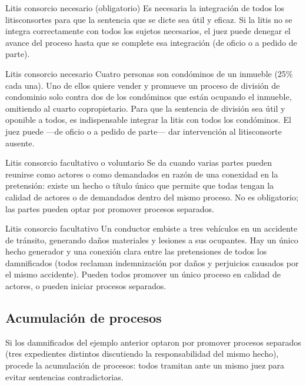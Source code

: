 \documentclass[12pt,oneside]{book}
\begin{document}
\begin{definition}{Litis consorcio necesario (obligatorio)}
Es necesaria la integración de todos los litisconsortes para que la sentencia que se dicte sea útil y eficaz. Si la litis no se integra correctamente con todos los sujetos necesarios, el juez puede denegar el avance del proceso hasta que se complete esa integración (de oficio o a pedido de parte).
\end{definition}

\begin{example}{Litis consorcio necesario}
Cuatro personas son condóminos de un inmueble (25\% cada una). Uno de ellos quiere vender y promueve un proceso de división de condominio solo contra dos de los condóminos que están ocupando el inmueble, omitiendo al cuarto copropietario. Para que la sentencia de división sea útil y oponible a todos, es indispensable integrar la litis con todos los condóminos. El juez puede —de oficio o a pedido de parte— dar intervención al litisconsorte ausente.
\end{example}

\begin{definition}{Litis consorcio facultativo o voluntario}
Se da cuando varias partes pueden reunirse como actores o como demandados en razón de una conexidad en la pretensión: existe un hecho o título único que permite que todas tengan la calidad de actores o de demandados dentro del mismo proceso. No es obligatorio; las partes pueden optar por promover procesos separados.
\end{definition}

\begin{example}{Litis consorcio facultativo}
Un conductor embiste a tres vehículos en un accidente de tránsito, generando daños materiales y lesiones a sus ocupantes. Hay un único hecho generador y una conexión clara entre las pretensiones de todos los damnificados (todos reclaman indemnización por daños y perjuicios causados por el mismo accidente). Pueden todos promover un único proceso en calidad de actores, o pueden iniciar procesos separados.
\end{example}

\subsection{Acumulación de procesos}

Si los damnificados del ejemplo anterior optaron por promover procesos separados (tres expedientes distintos discutiendo la responsabilidad del mismo hecho), procede la acumulación de procesos: todos tramitan ante un mismo juez para evitar sentencias contradictorias.
\end{document}
